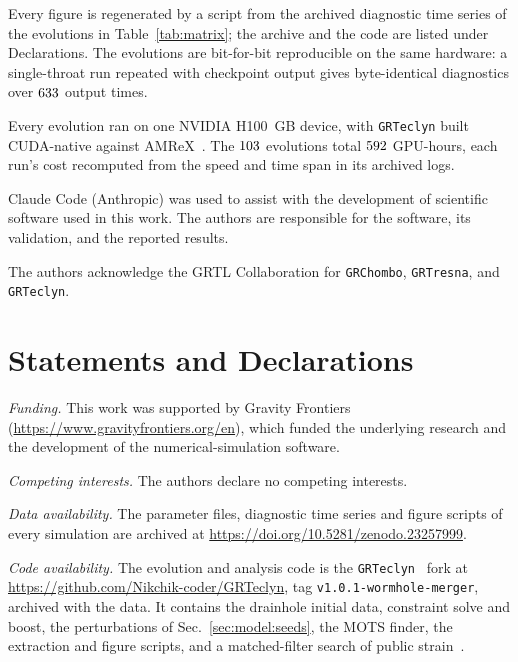 \documentclass[twocolumn,floatfix,aps,prd,superscriptaddress,nofootinbib,showkeys]{revtex4-2}
\begin{document}
Every figure is regenerated by a script from the archived diagnostic time series of the evolutions in Table~\ref{tab:matrix}; the archive and the code are listed under Declarations. The evolutions are bit-for-bit reproducible on the same hardware: a single-throat run repeated with checkpoint output gives byte-identical diagnostics over $633$ output times.

Every evolution ran on one NVIDIA H100 \clmDetMemDevice\,GB device, with \texttt{GRTeclyn} built CUDA-native against AMReX~\clmDetAmrexVersion. The $103$ evolutions total $592$ GPU-hours, each run's cost recomputed from the speed and time span in its archived logs.

Claude Code (Anthropic) was used to assist with the development of scientific software used in this work. The authors are responsible for the software, its validation, and the reported results.

\begin{acknowledgments}
The authors acknowledge the GRTL Collaboration for \texttt{GRChombo}, \texttt{GRTresna},
and \texttt{GRTeclyn}.
\end{acknowledgments}

\section*{Statements and Declarations}
\textit{Funding.} This work was supported by Gravity Frontiers (\url{https://www.gravityfrontiers.org/en}), which funded the underlying research and the development of the numerical-simulation software.

\textit{Competing interests.} The authors declare no competing interests.

\textit{Data availability.} The parameter files, diagnostic time series and figure scripts of every simulation are archived at \url{https://doi.org/10.5281/zenodo.23257999}.

\textit{Code availability.} The evolution and analysis code is the \texttt{GRTeclyn}~\cite{grteclyn} fork at \url{https://github.com/Nikchik-coder/GRTeclyn}, tag \texttt{v1.0.1-wormhole-merger}, archived with the data. It contains the drainhole initial data, constraint solve and boost, the perturbations of Sec.~\ref{sec:model:seeds}, the MOTS finder, the extraction and figure scripts, and a matched-filter search of public strain~\cite{gwosc,pycbc}.

\FloatBarrier
\end{document}
